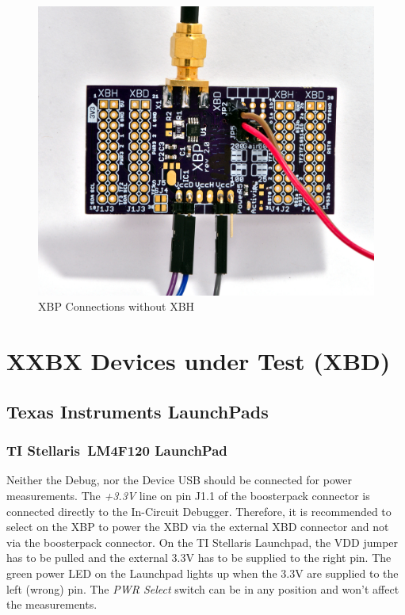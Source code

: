 \documentclass[twoside,11pt]{cergdoc}
\begin{document}
\begin{figure}[ht]
  \begin{center}
    \includegraphics[scale=1]{figures/xbp-no-xbh-connections}
    \caption{XBP Connections without XBH}\label{fig:noxbh}
  \end{center}
\vspace{-1ex}
\end{figure}

\chapter{XXBX Devices under Test (XBD)}\label{sec:xbd}

\section{Texas Instruments LaunchPads}

\subsection{TI Stellaris\textregistered~LM4F120 LaunchPad}

Neither the Debug, nor the Device USB should be connected for power measurements.
The \emph{+3.3V} line on pin J1.1 of the boosterpack connector is connected 
directly to the In-Circuit Debugger. Therefore, it is recommended to select on the
XBP to power the XBD via the external XBD connector and not via the boosterpack
connector. On the TI Stellaris Launchpad, the VDD jumper has to be pulled and the
external 3.3V has to be supplied to the right pin. The green power LED on the
Launchpad lights up when the 3.3V are supplied to the left (wrong) pin. 
The \emph{PWR Select} switch can be in any position and won't affect the 
measurements.
\end{document}
